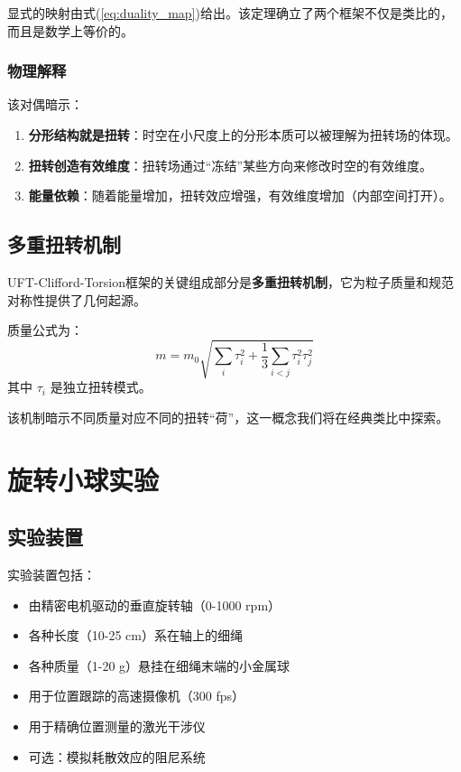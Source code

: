 \documentclass[12pt,a4paper]{article}
\begin{document}
显式的映射由式(\ref{eq:duality_map})给出。该定理确立了两个框架不仅是类比的，而且是数学上等价的。

\subsubsection{物理解释}

该对偶暗示：
\begin{enumerate}
    \item \textbf{分形结构就是扭转}：时空在小尺度上的分形本质可以被理解为扭转场的体现。
    \item \textbf{扭转创造有效维度}：扭转场通过``冻结''某些方向来修改时空的有效维度。
    \item \textbf{能量依赖}：随着能量增加，扭转效应增强，有效维度增加（内部空间打开）。
\end{enumerate}

\subsection{多重扭转机制}

UFT-Clifford-Torsion框架的关键组成部分是\textbf{多重扭转机制}，它为粒子质量和规范对称性提供了几何起源。

质量公式为：
\begin{equation}
    m = m_0 \sqrt{\sum_i \tau_i^2 + \frac{1}{3}\sum_{i<j} \tau_i^2 \tau_j^2}
\end{equation}
其中 $\tau_i$ 是独立扭转模式。

该机制暗示不同质量对应不同的扭转``荷''，这一概念我们将在经典类比中探索。

\section{旋转小球实验}
\label{sec:experiment}

\subsection{实验装置}

实验装置包括：
\begin{itemize}
    \item 由精密电机驱动的垂直旋转轴（0-1000 rpm）
    \item 各种长度（10-25 cm）系在轴上的细绳
    \item 各种质量（1-20 g）悬挂在细绳末端的小金属球
    \item 用于位置跟踪的高速摄像机（300 fps）
    \item 用于精确位置测量的激光干涉仪
    \item 可选：模拟耗散效应的阻尼系统
\end{itemize}
\end{document}
